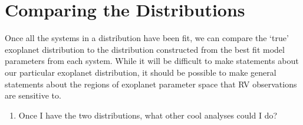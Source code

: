 \documentclass[12pt,modern]{article}
\begin{document}
\section{Comparing the Distributions}
\label{sec: (4)}
Once all the systems in a distribution have been fit, we can compare the `true' exoplanet distribution to the distribution constructed from the best fit model parameters from each system. While it will be difficult to make statements about our particular exoplanet distribution, it should be possible to make general statements about the regions of exoplanet parameter space that RV observations are sensitive to.

\begin{enumerate}
  \item Once I have the two distributions, what other cool analyses could I do?
\end{enumerate}
\end{document}
